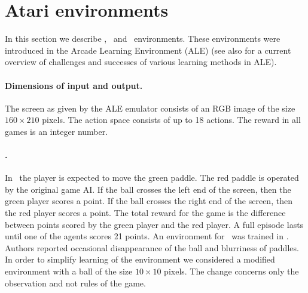 \section{Atari environments}
\label{envs}
\label{sec:envs}
In this section we describe \pong, \breakout\ and \freeway\ environments. These environments were introduced in the Arcade Learning Environment (ALE) \cite{ale} (see also \cite{ale2} for a current overview of challenges and successes of various learning methods in ALE). 

\paragraph{Dimensions of input and output.} The screen as given by the ALE emulator consists of an RGB image of the size $160\times 210$ pixels.  The action space consists of up to 18 actions. The reward in all games is an integer number.

\paragraph{\pong.} In \pong\ the player is expected to move the green paddle. The red paddle is operated by the original game AI. If the ball crosses the left end of the screen, then the green player scores a point. If the ball crosses the right end of the screen, then the red player scores a point. The total reward for the game is the difference between points scored by the green player and the red player. A full episode lasts until one of the agents scores 21 points. An environment for \pong\ was trained in \cite{recurrent}. Authors reported occasional disappearance of the ball and blurriness of paddles. In order to simplify learning of the environment we considered a modified environment with a ball of the size $10\times 10$ pixels. The change concerns only the observation and not rules of the game. 

